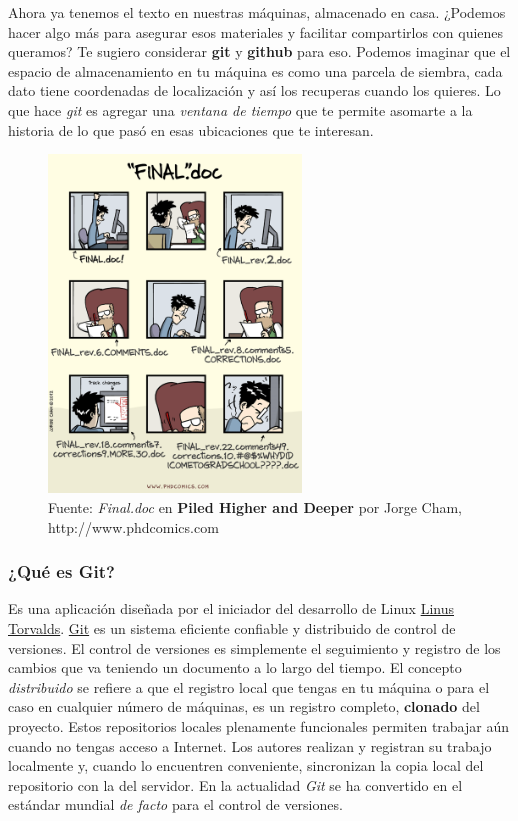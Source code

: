 \documentclass[
  letterpaper,
  DIV=11,
  numbers=noendperiod]{scrartcl}
\begin{document}
Ahora ya tenemos el texto en nuestras máquinas, almacenado en casa.
¿Podemos hacer algo más para asegurar esos materiales y facilitar
compartirlos con quienes queramos? Te sugiero considerar \textbf{git} y
\textbf{github} para eso. Podemos imaginar que el espacio de
almacenamiento en tu máquina es como una parcela de siembra, cada dato
tiene coordenadas de localización y así los recuperas cuando los
quieres. Lo que hace \emph{git} es agregar una \emph{ventana de tiempo}
que te permite asomarte a la historia de lo que pasó en esas ubicaciones
que te interesan.

\begin{figure}[H]

\caption{Fuente: \emph{Final.doc} en \textbf{Piled Higher and Deeper}
por Jorge Cham, http://www.phdcomics.com}

{\centering \includegraphics[width=0.6\textwidth,height=\textheight]{images/version_control_motivation_comics.png}

}

\end{figure}%

\subsubsection{¿Qué es Git?}\label{quuxe9-es-git}

Es una aplicación diseñada por el iniciador del desarrollo de Linux
\href{https://es.wikipedia.org/wiki/Linus_Torvalds}{Linus Torvalds}.
\href{https://git-scm.com/}{Git} es un sistema eficiente confiable y
distribuido de control de versiones. El control de versiones es
simplemente el seguimiento y registro de los cambios que va teniendo un
documento a lo largo del tiempo. El concepto \emph{distribuido} se
refiere a que el registro local que tengas en tu máquina o para el caso
en cualquier número de máquinas, es un registro completo,
\textbf{clonado} del proyecto. Estos repositorios locales plenamente
funcionales permiten trabajar aún cuando no tengas acceso a Internet.
Los autores realizan y registran su trabajo localmente y, cuando lo
encuentren conveniente, sincronizan la copia local del repositorio con
la del servidor. En la actualidad \emph{Git} se ha convertido en el
estándar mundial \emph{de facto} para el control de versiones.
\end{document}
